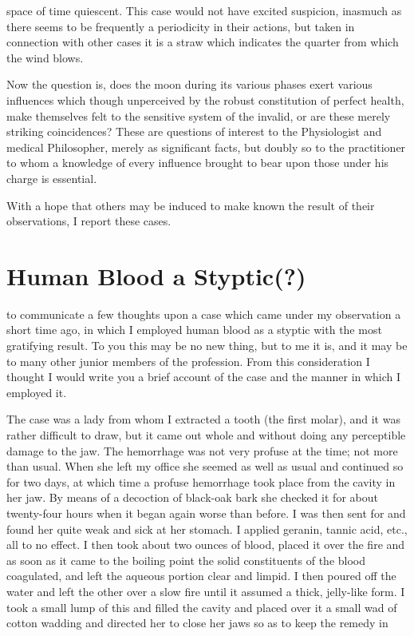 space of time quiescent. This case would not have excited suspicion,
inasmuch as there seems to be frequently a periodicity in their
actions, but taken in connection with other cases it is a straw which
indicates the quarter from which the wind blows.

Now the question is, does the moon during its various phases exert
various influences which though unperceived by the robust constitution
of perfect health, make themselves felt to the sensitive system
of the invalid, or are these merely striking coincidences? These are
questions of interest to the Physiologist and medical Philosopher,
merely as significant facts, but doubly so to the practitioner to whom
a knowledge of every influence brought to bear upon those under his
charge is essential.

With a hope that others may be induced to make known the result
of their observations, I report these cases.

\section*{Human Blood a Styptic(?)}


 to communicate a few thoughts upon a case which came under
my observation a short time ago, in which I employed human blood as
a styptic with the most gratifying result. To you this may be no new
thing, but to me it is, and it may be to many other junior members of
the profession. From this consideration I thought I would write you
a brief account of the case and the manner in which I employed it.

The case was a lady from whom I extracted a tooth (the first molar),
and it was rather difficult to draw, but it came out whole and without
doing any perceptible damage to the jaw. The hemorrhage was not
very profuse at the time; not more than usual. When she left my office
she seemed as well as usual and continued so for two days, at which
time a profuse hemorrhage took place from the cavity in her jaw. By
means of a decoction of black-oak bark she checked it for about twenty-four
hours when it began again worse than before. I was then sent for
and found her quite weak and sick at her stomach. I applied geranin,
tannic acid, etc., all to no effect. I then took about two ounces of blood,
placed it over the fire and as soon as it came to the boiling point the
solid constituents of the blood coagulated, and left the aqueous portion
clear and limpid. I then poured off the water and left the other over
a slow fire until it assumed a thick, jelly-like form. I took a small lump
of this and filled the cavity and placed over it a small wad of cotton
wadding and directed her to close her jaws so as to keep the remedy in\endinput
